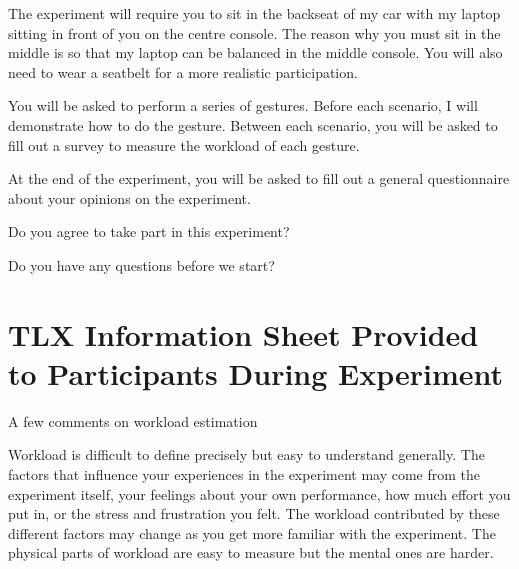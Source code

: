 \documentclass{l4proj}
\begin{document}
\begin{appendices}
The experiment will require you to sit in the backseat of my car with my laptop sitting in front of you on the centre console. The reason why you must sit in the middle is so that my laptop can be balanced in the middle console. You will also need to wear a seatbelt for a more realistic participation.

You will be asked to perform a series of gestures. Before each scenario, I will demonstrate how to do the gesture. Between each scenario, you will be asked to fill out a survey to measure the workload of each gesture.

At the end of the experiment, you will be asked to fill out a general questionnaire about your opinions on the experiment.

Do you agree to take part in this experiment?

Do you have any questions before we start?
\cleardoublepage 
\section{TLX Information Sheet Provided to Participants During Experiment}
\label{section:TLXInfoSheet}
A few comments on workload estimation

Workload is difficult to define precisely but easy to understand generally. The factors that influence your experiences in the experiment may come from the experiment itself, your feelings about your own performance, how much effort you put in, or the stress and frustration you felt. The workload contributed by these different factors may change as you get more familiar with the experiment. The physical parts of workload are easy to measure but the mental ones are harder.


\end{appendices}
\end{document}
